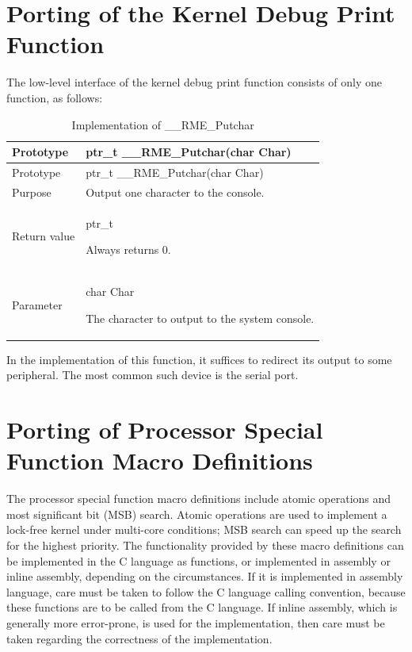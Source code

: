 \section{Porting of the Kernel Debug Print Function}\label{sec:7-kernel-debug-print-function-porting}

The low-level interface of the kernel debug print function consists of only one function, as follows:

\begin{xltabular}{\textwidth}{@{}>{\hsize\raggedright\arraybackslash}X>{\hsize\raggedright\arraybackslash}X@{}}
\caption{Implementation of \_\_RME\_Putchar}\label{tab:7-28-rme-putchar-implementation}\\
\toprule
Prototype & ptr\_t \_\_RME\_Putchar(char Char)\tabularnewline
\endfirsthead
\toprule
Prototype & ptr\_t \_\_RME\_Putchar(char Char)\tabularnewline
\midrule
\endhead
\bottomrule
\endlastfoot
Purpose & Output one character to the console.\tabularnewline
Return value\strut
 & ptr\_t

Always returns 0.\strut
\tabularnewline
Parameter\strut
 & char Char

The character to output to the system console.\strut
\tabularnewline
\end{xltabular}
\nopagebreak[4]

In the implementation of this function, it suffices to redirect its output to some peripheral. The most common such device is the serial port.

\section{Porting of Processor Special Function Macro Definitions}\label{sec:7-processor-special-function-macro-porting}

The processor special function macro definitions include atomic operations and most significant
bit (MSB) search. Atomic operations are used to implement a lock-free kernel under multi-core
conditions; MSB search can speed up the search for the highest priority. The functionality provided by these macro definitions can be implemented in the C language as functions, or implemented in assembly or inline assembly, depending on the circumstances. If it is implemented in assembly language, care must be taken to follow the C language calling convention, because these functions are to be called from the C language. If inline assembly, which is generally more error-prone, is used for the implementation, then care must be taken regarding the correctness of the implementation.

